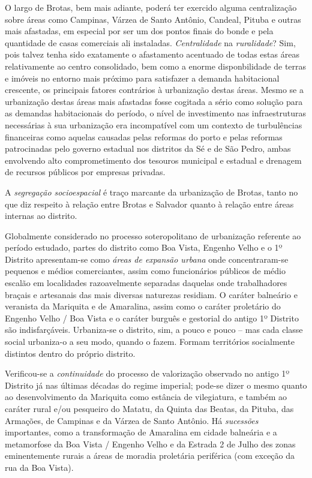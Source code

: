 O largo de Brotas, bem mais adiante, poderá ter exercido alguma centralização sobre áreas como Campinas, Várzea de Santo Antônio, Candeal, Pituba e outras mais afastadas, em especial por ser um dos pontos finais do bonde e pela quantidade de casas comerciais ali instaladas. \textit{Centralidade} na \textit{ruralidade}? Sim, pois talvez tenha sido exatamente o afastamento acentuado de todas estas áreas relativamente ao centro consolidado, bem como a enorme disponbilidade de terras e imóveis no entorno mais próximo para satisfazer a demanda habitacional crescente, os principais fatores contrários à urbanização destas áreas. Mesmo se a urbanização destas áreas mais afastadas fosse cogitada a sério como solução para as demandas habitacionais do período, o nível de investimento nas infraestruturas necessárias à sua urbanização era incompatível com um contexto de turbulências financeiras como aquelas causadas pelas reformas do porto e pelas reformas patrocinadas pelo governo estadual nos distritos da Sé e de São Pedro, ambas envolvendo alto comprometimento dos tesouros municipal e estadual e drenagem de recursos públicos por empresas privadas.

A \textit{segregação socioespacial} é traço marcante da urbanização de Brotas, tanto no que diz respeito à relação entre Brotas e Salvador quanto à relação entre áreas internas ao distrito. 

Globalmente considerado no processo soteropolitano de urbanização referente ao período estudado, partes do distrito como Boa Vista, Engenho Velho e o 1º Distrito apresentam-se como \textit{áreas de expansão urbana} onde concentraram-se pequenos e médios comerciantes, assim como funcionários públicos de médio escalão em localidades razoavelmente separadas daquelas onde trabalhadores braçais e artesanais das mais diversas naturezas residiam. O caráter balneário e veranista da Mariquita e de Amaralina, assim como o caráter proletário do Engenho Velho / Boa Vista e o caráter burguês e gestorial do antigo 1º Distrito são indisfarçáveis. Urbaniza-se o distrito, sim, a pouco e pouco -- mas cada classe social urbaniza-o a seu modo, quando o fazem. Formam territórios socialmente distintos dentro do próprio distrito.

Verificou-se a \textit{continuidade} do processo de valorização observado no antigo 1º Distrito já nas últimas décadas do regime imperial; pode-se dizer o mesmo quanto ao desenvolvimento da Mariquita como estância de vilegiatura, e também ao caráter rural e/ou pesqueiro do Matatu, da Quinta das Beatas, da Pituba, das Armações, de Campinas e da Várzea de Santo Antônio. Há \textit{sucessões} importantes, como a transformação de Amaralina em cidade balneária e a metamorfose da Boa Vista / Engenho Velho e da Estrada 2 de Julho des zonas eminentemente rurais a áreas de moradia proletária periférica (com exceção da rua da Boa Vista).

